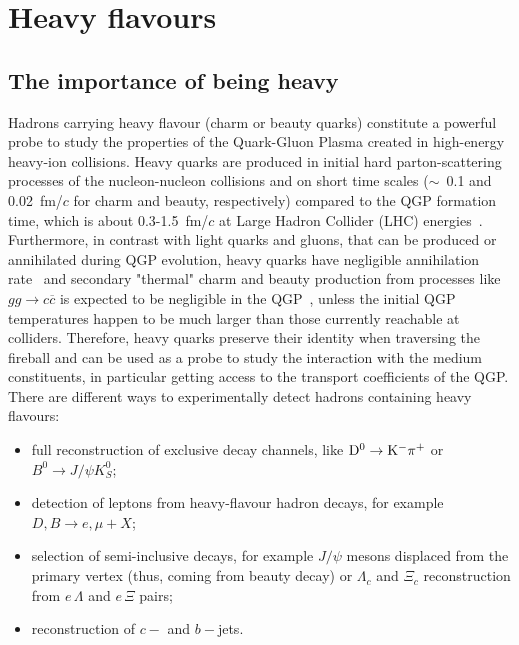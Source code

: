 \chapter{Heavy flavours} %
\label{Chapter2} %

\section{The importance of being heavy}
\label{sec:introChap2}
Hadrons carrying heavy flavour (charm or beauty quarks) 
constitute a powerful probe to study 
the properties of the Quark-Gluon Plasma created in high-energy 
heavy-ion collisions. Heavy quarks are produced in initial hard parton-scattering processes
of the nucleon-nucleon collisions and on short time scales ($\sim$~0.1 and 0.02~fm/$c$ for charm and beauty, respectively) compared 
to the QGP formation time, which is about 0.3-1.5~fm/$c$ at Large Hadron Collider (LHC) energies~\cite{Liu:2012ax}.
Furthermore, in contrast with light quarks and gluons, that can be produced or annihilated 
during QGP evolution, heavy quarks have negligible annihilation 
rate~\cite{BraunMunzinger:2007tn} and secondary "thermal" 
charm and beauty production from processes like $gg \rightarrow c\overline{c}$ is 
expected to be negligible in the QGP~\cite{Zhang:2007dm}, 
unless the initial QGP temperatures happen to be much larger than 
those currently reachable at colliders. Therefore,
heavy quarks preserve their identity when traversing 
the fireball and can be used as a probe
to study the interaction with the medium
 constituents, in particular getting access to the 
transport coefficients of the QGP.\\
There are different ways to experimentally detect hadrons 
containing heavy flavours:
\begin{itemize}
\item full reconstruction of exclusive decay channels, 
like ${\rm D^0\to K^-\pi^+}$ or $B^0 \rightarrow J/\psi K^0_S$;
\item detection of leptons from heavy-flavour hadron decays, for example 
$D, B \rightarrow e, \mu + X$;
\item selection of semi-inclusive decays, 
for example $J/\psi$ mesons displaced 
from the primary vertex (thus, coming from beauty decay) or $\Lambda_c$ and
$\Xi_c$ reconstruction from $e\, \Lambda$ and $e\, \Xi$ pairs;
\item reconstruction of $c-$ and $b-$jets.
\end{itemize}
